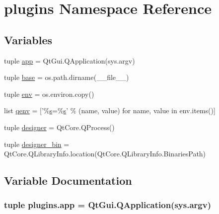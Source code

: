 \hypertarget{namespaceplugins}{}\section{plugins Namespace Reference}
\label{namespaceplugins}
\subsection*{Variables}
\begin{DoxyCompactItemize}
\item 
tuple \hyperlink{namespaceplugins_a3ab406b593d58b54bfd5ef22bdf15fab}{app} = Qt\+Gui.\+Q\+Application(sys.\+argv)
\item 
tuple \hyperlink{namespaceplugins_a3fd3ca789a728fdb7c30556d62947f38}{base} = os.\+path.\+dirname(\+\_\+\+\_\+file\+\_\+\+\_\+)
\item 
tuple \hyperlink{namespaceplugins_a1fe16c04b703ae979711d6a18495e54e}{env} = os.\+environ.\+copy()
\item 
list \hyperlink{namespaceplugins_a22af2107e74b56e5128176d61884224c}{qenv} = \mbox{[}'\%\hyperlink{indexexpr_8h_ae024b0db549122b44c349ae28ec990dc}{s}=\%\hyperlink{indexexpr_8h_ae024b0db549122b44c349ae28ec990dc}{s}' \% (name, value) for name, value in env.\+items()\mbox{]}
\item 
tuple \hyperlink{namespaceplugins_a44e1bde0a42fc0e777e41ad4a32463f7}{designer} = Qt\+Core.\+Q\+Process()
\item 
tuple \hyperlink{namespaceplugins_a1a51d09b247c9d4905043a7a95e9b519}{designer\+\_\+bin} = Qt\+Core.\+Q\+Library\+Info.\+location(Qt\+Core.\+Q\+Library\+Info.\+Binaries\+Path)
\end{DoxyCompactItemize}


\subsection{Variable Documentation}
\hypertarget{namespaceplugins_a3ab406b593d58b54bfd5ef22bdf15fab}{}
\subsubsection[{app}]{\setlength{\rightskip}{0pt plus 5cm}tuple plugins.\+app = Qt\+Gui.\+Q\+Application(sys.\+argv)}\label{namespaceplugins_a3ab406b593d58b54bfd5ef22bdf15fab}
\hypertarget{namespaceplugins_a3fd3ca789a728fdb7c30556d62947f38}{}
